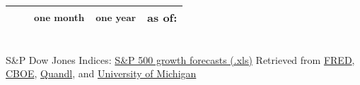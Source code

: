 \documentclass{report}
\newcommand{\cf}[2][]{\indent \color{black!90} \scriptsize{{#1} \hfill {#2}}}
\begin{document}
		\begin{minipage}[ht!]{.5\linewidth}
		\vspace{-55mm}
		\centering
		\setlength{\tabcolsep}{0.7pt}
		\scriptsize
		\color{black!80}
		{\renewcommand{\arraystretch}{1.65}
		\begin{tabular}{l r r r r r r}
			 & & \multicolumn{2}{c}{\normalsize\textsubscript{one month}} & \multicolumn{2}{c}{\normalsize\textsubscript{one year}} & as of:\\ \hline 
			
			\hline
		\end{tabular}}
		\end{minipage}%
		 \\
		\cf[S\&P Dow Jones Indices:
			\href{https://us.spindices.com/documents/additional-material/sp-500-eps-est.xlsx}
			{S\&P 500 growth forecasts (.xls)}]
				{Retrieved from \href{https://fred.stlouisfed.org/}{FRED}, 
				\href{http://www.cboe.com}{CBOE}, \href{https://www.quandl.com}{Quandl}, and 
				\href{http://www.sca.isr.umich.edu/}{University of Michigan}}
\end{document}
